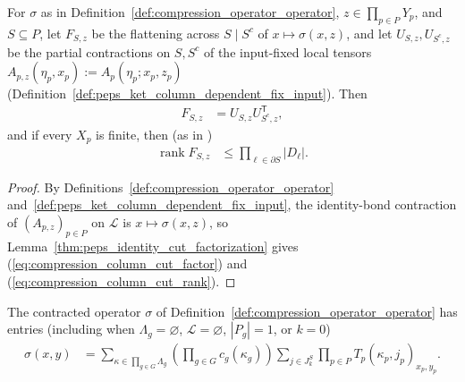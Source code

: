 \begin{lemma}
    \label{thm:compression_operator_column_cut_rank}
    \leanok
    For $\sigma$ as in Definition~\ref{def:compression_operator_operator}, $z\in\prod_{p\in P}Y_p$, and $S\subseteq P$, let $F_{S,z}$ be the flattening across $S\mid S^c$ of $x\mapsto\sigma(x,z)$, and let $U_{S,z},U_{S^c,z}$ be the partial contractions on $S,S^c$ of the input-fixed local tensors $A_{p,z}(\eta_p,x_p):=A_p(\eta_p;x_p,z_p)$ (Definition~\ref{def:peps_ket_column_dependent_fix_input}). Then
    \begin{align}
        F_{S,z} & =U_{S,z}U_{S^c,z}^{\mathsf T},
        \label{eq:compression_column_cut_factor}
    \end{align}
    and if every $X_p$ is finite, then (as in \cite[Lemma~8.1]{OpenAI2026PolynomialPEPS})
    \begin{align}
        \operatorname{rank}F_{S,z}
         & \le\prod_{\ell\in\partial S}|D_\ell|.
        \label{eq:compression_column_cut_rank}
    \end{align}
\end{lemma}

\begin{proof}\leanok
    By Definitions~\ref{def:compression_operator_operator} and~\ref{def:peps_ket_column_dependent_fix_input}, the identity-bond contraction of $(A_{p,z})_{p\in P}$ on $\mathcal L$ is $x\mapsto\sigma(x,z)$, so Lemma~\ref{thm:peps_identity_cut_factorization} gives (\ref{eq:compression_column_cut_factor}) and (\ref{eq:compression_column_cut_rank}).
\end{proof}

\begin{lemma}
    \label{thm:compression_operator_branch_sum}
    \leanok
    The contracted operator $\sigma$ of Definition~\ref{def:compression_operator_operator} has entries (including when $\Lambda_g=\varnothing$, $\mathcal L=\varnothing$, $|P_g|=1$, or $k=0$)
    \begin{align}
        \sigma(x,y)
         & =\sum_{\kappa\in\prod_{g\in G}\Lambda_g}
        \left(\prod_{g\in G}c_g(\kappa_g)\right)
        \sum_{j\in J_k^S}\prod_{p\in P}T_p(\kappa_p,j_p)_{x_p,y_p}.
        \label{eq:compression_operator_branch_sum}
    \end{align}
\end{lemma}

